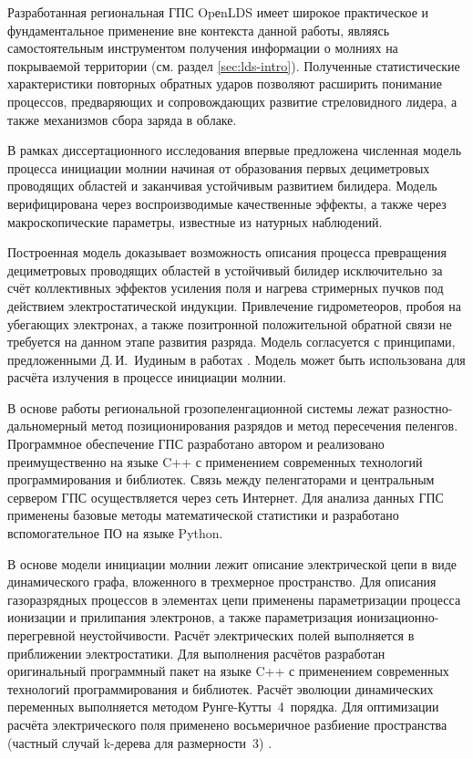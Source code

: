 {\influence}
Разработанная региональная ГПС OpеnLDS имеет широкое практическое и фундаментальное применение вне контекста данной работы, являясь самостоятельным инструментом получения информации о молниях на покрываемой территории (см. раздел \ref{sec:lds-intro}). Полученные статистические характеристики повторных обратных ударов позволяют расширить понимание процессов, предваряющих и сопровождающих развитие стреловидного лидера, а также механизмов сбора заряда в облаке. 

В рамках диссертационного исследования впервые предложена численная модель процесса инициации молнии начиная от образования первых дециметровых проводящих областей и заканчивая устойчивым развитием билидера. Модель верифицирована через воспроизводимые качественные эффекты, а также через макроскопические параметры, известные из натурных наблюдений. 

Построенная модель доказывает возможность описания процесса превращения дециметровых проводящих областей в устойчивый билидер исключительно за счёт коллективных эффектов усиления поля и нагрева стримерных пучков под действием электростатической индукции. Привлечение гидрометеоров, пробоя на убегающих электронах, а также позитронной положительной обратной связи не требуется на данном этапе развития разряда. Модель согласуется с принципами, предложенными Д.\,И.~Иудиным в работах \autocite{Iudin2017,IudinRakov2017}. Модель может быть использована для расчёта излучения в процессе инициации молнии.


{\methods}
В основе работы региональной грозопеленгационной системы лежат разностно-дальномерный метод позиционирования разрядов и метод пересечения пеленгов. Программное обеспечение ГПС разработано автором и реализовано преимущественно на языке C++ с применением современных технологий программирования и библиотек. Связь между пеленгаторами и центральным сервером ГПС осуществляется через сеть Интернет. Для анализа данных ГПС применены базовые методы математической статистики и разработано вспомогательное ПО на языке Python.

В основе модели инициации молнии лежит описание электрической цепи в виде динамического графа, вложенного в трехмерное пространство. Для описания газоразрядных процессов в элементах цепи применены параметризации процесса ионизации и прилипания электронов, а также параметризация ионизационно-перегревной неустойчивости. Расчёт электрических полей выполняется в приближении электростатики. Для выполнения расчётов разработан оригинальный программный пакет на языке C++ с применением современных технологий программирования и библиотек. Расчёт эволюции динамических переменных выполняется методом Рунге-Кутты~4~порядка. Для оптимизации расчёта электрического поля применено восьмеричное разбиение пространства (частный случай k-дерева для размерности~3) \cite{Bentley1975}.

